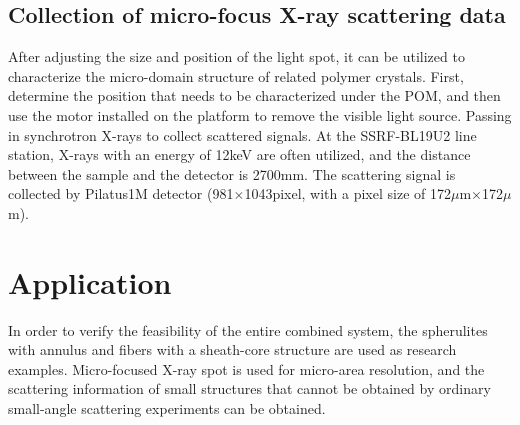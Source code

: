 \documentclass{Head}
\begin{document}
\subsection{Collection of micro-focus X-ray scattering data}
After adjusting the size and position of the light spot, it can be utilized to characterize the micro-domain structure of related polymer crystals.
First, determine the position that needs to be characterized under the POM, and then use the motor installed on the platform to remove the visible light source. Passing in synchrotron X-rays to collect scattered signals.
At the SSRF-BL19U2 line station, X-rays with an energy of 12keV are often utilized, and the distance between the sample and the detector is 2700mm.
The scattering signal is collected by Pilatus1M detector (981$\times$1043pixel, with a pixel size of 172$\mu$m$\times$172$\mu$m).


\section{Application}
In order to verify the feasibility of the entire combined system, the spherulites with annulus and fibers with a sheath-core structure are used as research examples.
Micro-focused X-ray spot is used for micro-area resolution, and the scattering information of small structures that cannot be obtained by ordinary small-angle scattering experiments can be obtained.
\end{document}
